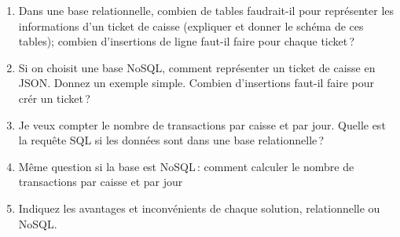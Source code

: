 \documentclass[11pt,a4paper]{article}
\begin{document}
\begin{enumerate}
  \item Dans une base relationnelle, combien de tables faudrait-il pour représenter 
         les informations d'un ticket de caisse (expliquer et donner le schéma de ces tables); combien d'insertions de ligne
             faut-il faire pour chaque ticket\,?
    \item Si on choisit une base NoSQL, comment représenter un ticket de caisse en JSON.
        Donnez un exemple simple. Combien d'insertions faut-il faire pour crér un ticket\,?
   \item Je veux compter le nombre de transactions par caisse et par jour.  Quelle est la requête SQL si les données
       sont dans une base relationnelle\,?
    \item Même question si la base est NoSQL\,: comment calculer le nombre de transactions par caisse et par jour
    \item Indiquez les avantages et inconvénients de chaque solution, relationnelle ou NoSQL.
 \end{enumerate}
\end{document}
